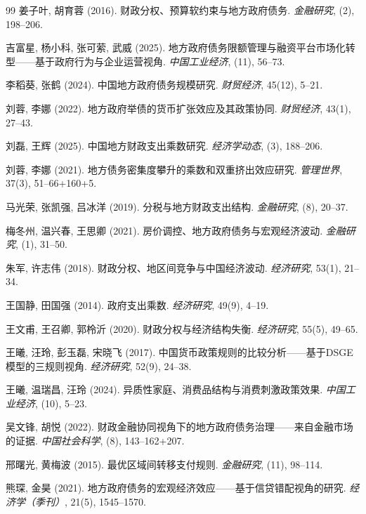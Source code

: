 \documentclass[12pt,UTF8]{ctexart}
\begin{document}
\begin{thebibliography}{99}
		姜子叶, 胡育蓉 (2016). 财政分权、预算软约束与地方政府债务. \textit{金融研究}, (2), 198--206.
		
		吉富星, 杨小科, 张可萦, 武威 (2025). 地方政府债务限额管理与融资平台市场化转型——基于政府行为与企业运营视角. \textit{中国工业经济}, (11), 56--73.
		
		李稻葵, 张鹤 (2024). 中国地方政府债务规模研究. \textit{财贸经济}, 45(12), 5--21.
		
		刘蓉, 李娜 (2022). 地方政府举债的货币扩张效应及其政策协同. \textit{财贸经济}, 43(1), 27--43.
		
		刘磊, 王辉 (2025). 中国地方财政支出乘数研究. \textit{经济学动态}, (3), 188--206.
		
		刘蓉, 李娜 (2021). 地方债务密集度攀升的乘数和双重挤出效应研究. \textit{管理世界}, 37(3), 51--66+160+5.
		
		马光荣, 张凯强, 吕冰洋 (2019). 分税与地方财政支出结构. \textit{金融研究}, (8), 20--37.
		
		梅冬州, 温兴春, 王思卿 (2021). 房价调控、地方政府债务与宏观经济波动. \textit{金融研究}, (1), 31--50.
		
		朱军, 许志伟 (2018). 财政分权、地区间竞争与中国经济波动. \textit{经济研究}, 53(1), 21--34.
		
		王国静, 田国强 (2014). 政府支出乘数. \textit{经济研究}, 49(9), 4--19.
		
		王文甫, 王召卿, 郭柃沂 (2020). 财政分权与经济结构失衡. \textit{经济研究}, 55(5), 49--65.
		
		王曦, 汪玲, 彭玉磊, 宋晓飞 (2017). 中国货币政策规则的比较分析——基于DSGE模型的三规则视角. \textit{经济研究}, 52(9), 24--38.
		
		王曦, 温瑞昌, 汪玲 (2024). 异质性家庭、消费品结构与消费刺激政策效果. \textit{中国工业经济}, (10), 5--23.
		
		吴文锋, 胡悦 (2022). 财政金融协同视角下的地方政府债务治理——来自金融市场的证据. \textit{中国社会科学}, (8), 143--162+207.
		
		邢曙光, 黄梅波 (2015). 最优区域间转移支付规则. \textit{金融研究}, (11), 98--114.
		
		熊琛, 金昊 (2021). 地方政府债务的宏观经济效应——基于信贷错配视角的研究. \textit{经济学（季刊）}, 21(5), 1545--1570.
		

\end{thebibliography}
\end{document}
